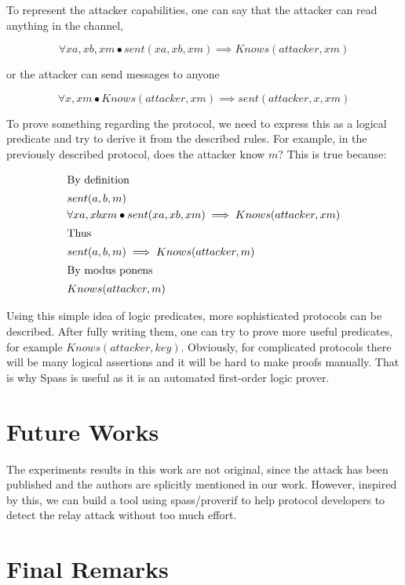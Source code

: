 \documentclass{article}
\begin{document}
	To represent the attacker capabilities, one can say that the attacker can read anything in the channel,
	
	$$ \forall xa, xb, xm \bullet  sent(xa,xb,xm) \implies Knows(attacker, xm) $$

	or the attacker can send messages to anyone
	
	$$ \forall x, xm \bullet  Knows(attacker, xm) \implies sent(attacker, x, xm) $$

	To prove something regarding the protocol, we need to express this as a logical predicate and try to derive it from
	the described rules. For example, in the previously described protocol, does the attacker know $m$? This is true
	because:
		
	\begin{align*}
	\shortintertext{By definition}
	&sent(a,b,m)\\
	&\forall xa, xb xm \bullet  sent(xa,xb,xm) \implies Knows(attacker, xm)\\
	\shortintertext{Thus}
	&sent(a,b,m) \implies Knows(attacker, m)\\
	\shortintertext{By modus ponens}
	&Knows(attacker, m)\\
	\end{align*}

	Using this simple idea of logic predicates, more sophisticated protocols can be described. After fully writing them,
	one can try to prove more useful predicates, for example $Knows(attacker, key)$. Obviously, for complicated protocols
	there will be many logical assertions and it will be hard to make proofs manually. That is why Spass is useful as it
	is an automated first-order logic prover.
	

\section{Future Works}
	The experiments results in this work are not original, since the attack
	has been published and the authors are splicitly mentioned in our work.
	However, inspired by this, we can build a tool using spass/proverif to
	help protocol developers to detect the relay attack without too much
	effort.

\section{Final Remarks}
\end{document}

